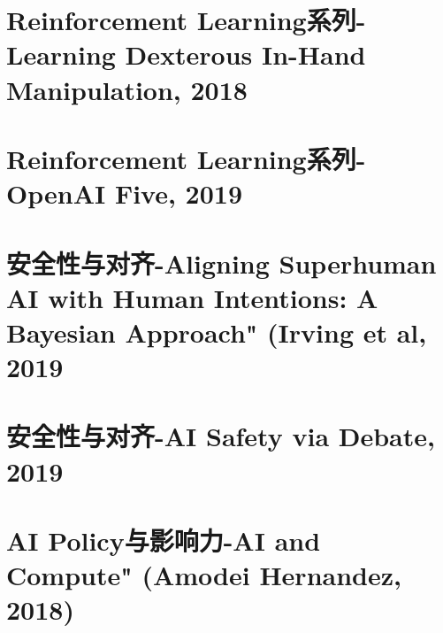 \documentclass[twocolumn, 10pt]{article} %
\begin{document}
\section{Reinforcement Learning系列-Learning Dexterous In-Hand Manipulation, 2018}


\section{Reinforcement Learning系列-OpenAI Five, 2019}


\section{安全性与对齐-Aligning Superhuman AI with Human Intentions: A Bayesian Approach" (Irving et al, 2019}

\section{安全性与对齐-AI Safety via Debate, 2019}



\section{AI Policy与影响力-AI and Compute" (Amodei  Hernandez, 2018)}
\end{document}

